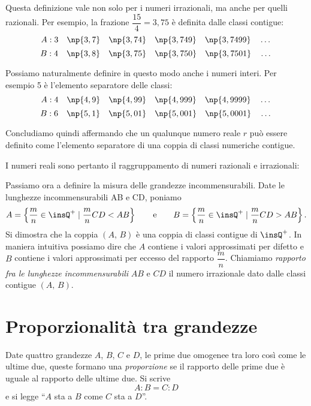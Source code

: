 Questa definizione vale non solo per i numeri irrazionali, ma anche 
per quelli razionali. Per esempio, la frazione \(\dfrac{15}{4}=3,75\) è 
definita dalle classi contigue:
\[A: 3\quad \np{3,7}\quad \np{3,74}\quad \np{3,749}\quad 
\np{3,7499}\quad \ldots{}\]
\[B: 4\quad \np{3,8}\quad \np{3,75}\quad \np{3,750}\quad 
\np{3,7501}\quad \ldots{}\]

Possiamo naturalmente definire in questo modo anche i numeri interi. 
Per esempio 5 è l'elemento separatore delle classi:
\[A: 4\quad \np{4,9}\quad \np{4,99}\quad \np{4,999}\quad 
\np{4,9999}\quad \ldots{}\]
\[B: 6\quad \np{5,1}\quad \np{5,01}\quad \np{5,001}\quad 
\np{5,0001}\quad \ldots{}\]

Concludiamo quindi affermando che un qualunque numero reale \(r\) può 
essere definito come l'elemento separatore di una coppia di classi 
numeriche contigue.


I numeri reali sono pertanto il raggruppamento di numeri razionali e 
irrazionali:

\begin{figure*}[!htb]
	\centering
\end{figure*}

Passiamo ora a definire la misura delle grandezze incommensurabili.
Date le lunghezze incommensurabili AB e CD, poniamo
\[A=\left\{\dfrac{m}{n}\in\insQ^+\mid\dfrac{m}{n}CD<AB\right\}
\qquad\text{e} \qquad 
B=\left\{\dfrac{m}{n}\in\insQ^+\mid\dfrac{m}{n}CD>AB\right\}.\]
Si dimostra che la coppia \((A\text{, }B)\) è una coppia di classi 
contigue di \(\insQ^+\). In maniera intuitiva possiamo dire che \(A\) 
contiene i valori approssimati per difetto e \(B\) contiene i valori 
approssimati per eccesso del rapporto \(\dfrac{m}{n}\).
Chiamiamo \emph{rapporto fra le lunghezze incommensurabili} \(AB\) e 
\(CD\) il numero irrazionale dato dalle classi contigue \((A\text{, }B)\).


\section{Proporzionalità tra grandezze}\label{sect:proporzioni}

\begin{definizione}
Date quattro grandezze \(A\), \(B\), \(C\) e \(D\), le prime due omogenee tra 
loro così come le ultime due, queste formano una \emph{proporzione} 
se il rapporto delle prime due è uguale al rapporto delle ultime due. 
Si scrive
\[\boxed{A : B = C : D}\]
e si legge ``\(A\) sta a \(B\) come \(C\) sta a \(D\)''.
\end{definizione}

